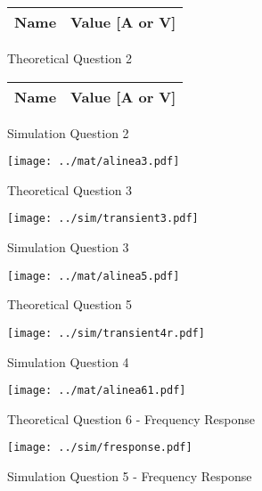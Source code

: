 \begin{figure}[H]
      \centering
      \begin{tabular}{ | c | c | }
      \hline    
      {\bf Name} & {\bf Value [A or V]} \\ \hline
      
      \hline
      \end{tabular}
      \caption{Theoretical Question 2}
    \endminipage\hfill
      \centering
      \begin{tabular}{ | c | c | }
      \hline    
      {\bf Name} & {\bf Value [A or V]} \\ \hline
      
      \end{tabular}
      \caption{Simulation Question 2}
    \endminipage\hfill
\end{figure}

\begin{figure}[H]
      \texttt{[image: ../mat/alinea3.pdf]}
      \caption{Theoretical Question 3}
    \endminipage\hfill
      \texttt{[image: ../sim/transient3.pdf]}
      \caption{Simulation Question 3}
    \endminipage\hfill
\end{figure}

\begin{figure}[H]
      \texttt{[image: ../mat/alinea5.pdf]}
      \caption{Theoretical Question 5}
    \endminipage\hfill
      \texttt{[image: ../sim/transient4r.pdf]}
      \caption{Simulation Question 4}
    \endminipage\hfill
\end{figure}

\begin{figure}[H]
      \texttt{[image: ../mat/alinea61.pdf]}
      \caption{Theoretical Question 6 - Frequency Response}
    \endminipage\hfill
      \texttt{[image: ../sim/fresponse.pdf]}
      \caption{Simulation Question 5 - Frequency Response}
    \endminipage\hfill
\end{figure}
